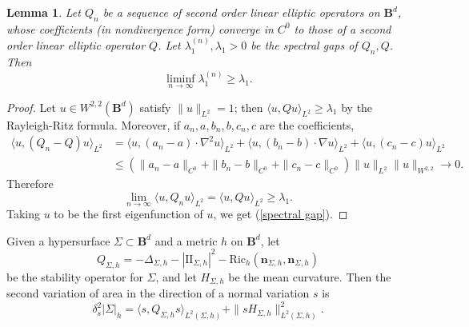 \documentclass[reqno,11pt]{amsart}
\newcommand{\Ball}{\mathbf{B}}
\newcommand{\Two}{\mathrm{I\!I}}
\newcommand{\normal}{\mathbf n}
\newcommand{\Ric}{\mathrm{Ric}}
\newtheorem{lemma}[theorem]{Lemma}
\theoremstyle{definition}
\numberwithin{equation}{section}
\begin{document}
\begin{lemma}
Let $Q_n$ be a sequence of second order linear elliptic operators on $\Ball^d$, whose coefficients (in nondivergence form) converge in $C^0$ to those of a second order linear elliptic operator $Q$.
Let $\lambda_1^{(n)}, \lambda_1 > 0$ be the spectral gaps of $Q_n, Q$.
Then 
\begin{equation}\label{spectral gap}
\liminf_{n \to \infty} \lambda_1^{(n)} \geq \lambda_1.
\end{equation}
\end{lemma}
\begin{proof}
Let $u \in W^{2, 2}(\Ball^d)$ satisfy $\|u\|_{L^2} = 1$; then $\langle u, Qu\rangle_{L^2} \geq \lambda_1$ by the Rayleigh-Ritz formula.
Moreover, if $a_n,a,b_n,b,c_n,c$ are the coefficients,
\begin{align*}
\langle u, (Q_n - Q)u\rangle_{L^2}
&= \langle u, (a_n - a) \cdot \nabla^2 u\rangle_{L^2} + \langle u, (b_n - b) \cdot \nabla u\rangle_{L^2} + \langle u, (c_n - c) u\rangle_{L^2} \\
&\leq (\|a_n - a\|_{C^0} + \|b_n - b\|_{C^0} + \|c_n - c\|_{C^0}) \|u\|_{L^2} \|u\|_{W^{2, 2}} \to 0.
\end{align*}
Therefore
$$\lim_{n \to \infty} \langle u, Q_n u\rangle_{L^2} = \langle u, Qu\rangle_{L^2} \geq \lambda_1.$$
Taking $u$ to be the first eigenfunction of $u$, we get (\ref{spectral gap}).
\end{proof}

Given a hypersurface $\Sigma \subset \Ball^d$ and a metric $h$ on $\Ball^d$, let
\begin{equation}\label{stability formula}
Q_{\Sigma, h} = -\Delta_{\Sigma, h} - |\Two_{\Sigma, h}|^2 - \Ric_h(\normal_{\Sigma, h}, \normal_{\Sigma, h})
\end{equation}
be the stability operator for $\Sigma$, and let $H_{\Sigma, h}$ be the mean curvature.
Then the second variation of area in the direction of a normal variation $s$ is \cite[Chapter 1, \S8.1]{colding2011course}
\begin{equation}\label{second variation formula}
\delta^2_s |\Sigma|_h = \langle s, Q_{\Sigma, h} s\rangle_{L^2(\Sigma, h)} + \|sH_{\Sigma, h}\|_{L^2(\Sigma, h)}^2.
\end{equation}
\end{document}
